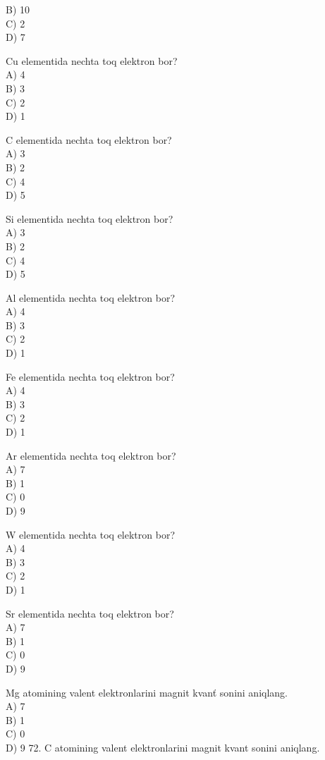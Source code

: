 B) 10\\
C) 2\\
D) 7
  \item Cu elementida nechta toq elektron bor?\\
A) 4\\
B) 3\\
C) 2\\
D) 1
  \item C elementida nechta toq elektron bor?\\
A) 3\\
B) 2\\
C) 4\\
D) 5
  \item Si elementida nechta toq elektron bor?\\
A) 3\\
B) 2\\
C) 4\\
D) 5
  \item Al elementida nechta toq elektron bor?\\
A) 4\\
B) 3\\
C) 2\\
D) 1
  \item Fe elementida nechta toq elektron bor?\\
A) 4\\
B) 3\\
C) 2\\
D) 1
  \item Ar elementida nechta toq elektron bor?\\
A) 7\\
B) 1\\
C) 0\\
D) 9
  \item W elementida nechta toq elektron bor?\\
A) 4\\
B) 3\\
C) 2\\
D) 1
  \item Sr elementida nechta toq elektron bor?\\
A) 7\\
B) 1\\
C) 0\\
D) 9
  \item Mg atomining valent elektronlarini magnit kvanť sonini aniqlang.\\
A) 7\\
B) 1\\
C) 0\\
D) 9
72. C atomining valent elektronlarini magnit kvant sonini aniqlang.\\
